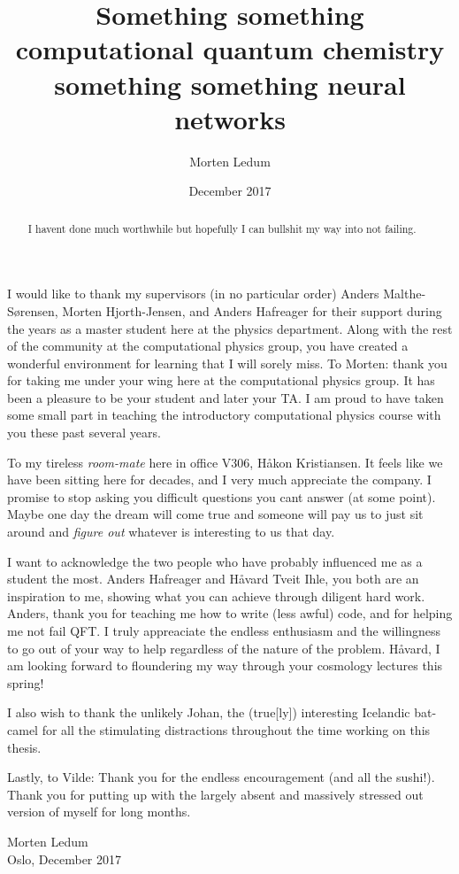 \documentclass[twoside,english]{uiofysmaster}
\author{Morten Ledum}
\title{Something something computational quantum chemistry something something neural networks}
\date{December 2017}
\begin{document}
\newcommand{\mainfile}{}
\maketitle

\begin{abstract}
I havent done much worthwhile but hopefully I can bullshit my way into not failing.
\end{abstract}



\begin{acknowledgements}
  I would like to thank my supervisors (in no particular order) Anders Malthe-Sørensen, Morten Hjorth-Jensen, and Anders Hafreager for their support during the years as a master student here at the physics department. Along with the rest of the community at the computational physics group, you have created a wonderful environment for learning that I will sorely miss. To Morten: thank you for taking me under your wing here at the computational physics group. It has been a pleasure to be your student and later your TA. I am proud to have taken some small part in teaching the introductory computational physics course with you these past several years. 

  To my tireless \emph{room-mate} here in office V306, Håkon Kristiansen. It feels like we have been sitting here for decades, and I very much appreciate the company. I promise to stop asking you difficult questions you cant answer (at some point). Maybe one day the dream will come true and someone will pay us to just sit around and \emph{figure out} whatever is interesting to us that day.

  I want to acknowledge the two people who have probably influenced me as a student the most. Anders Hafreager and Håvard Tveit Ihle, you both are an inspiration to me, showing what you can achieve through diligent hard work. Anders, thank you for teaching me how to write (less awful) code, and for helping me not fail QFT. I truly appreaciate the endless enthusiasm and the willingness to go out of your way to help regardless of the nature of the problem. Håvard, I am looking forward to floundering my way through your cosmology lectures this spring!

  I also wish to thank the unlikely Johan, the (true[ly]) interesting Icelandic bat-camel for all the stimulating distractions throughout the time working on this thesis.

  Lastly, to Vilde: Thank you for the endless encouragement (and all the sushi!). Thank you for putting up with the largely absent and massively stressed out version of myself for long months.
  \begin{flushright}
  Morten Ledum \\ Oslo, December 2017
  \end{flushright}

\end{acknowledgements}
\end{document}
